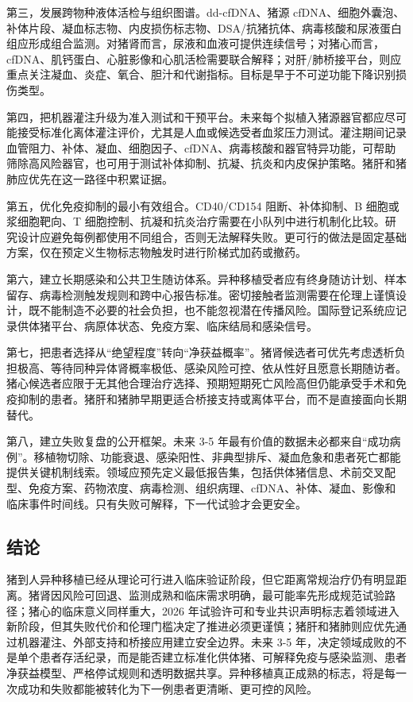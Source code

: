 \documentclass[
  chinese,
  11pt,a4paper]{article}
\begin{document}
第三，发展跨物种液体活检与组织图谱。dd-cfDNA、猪源
cfDNA、细胞外囊泡、补体片段、凝血标志物、内皮损伤标志物、DSA/抗猪抗体、病毒核酸和尿液蛋白组应形成组合监测。对猪肾而言，尿液和血液可提供连续信号；对猪心而言，cfDNA、肌钙蛋白、心脏影像和心肌活检需要联合解释；对肝/肺桥接平台，则应重点关注凝血、炎症、氧合、胆汁和代谢指标。目标是早于不可逆功能下降识别损伤类型。

第四，把机器灌注升级为准入测试和干预平台。未来每个拟植入猪源器官都应尽可能接受标准化离体灌注评价，尤其是人血或候选受者血浆压力测试。灌注期间记录血管阻力、补体、凝血、细胞因子、cfDNA、病毒核酸和器官特异功能，可帮助筛除高风险器官，也可用于测试补体抑制、抗凝、抗炎和内皮保护策略。猪肝和猪肺应优先在这一路径中积累证据。

第五，优化免疫抑制的最小有效组合。CD40/CD154 阻断、补体抑制、B
细胞或浆细胞靶向、T
细胞控制、抗凝和抗炎治疗需要在小队列中进行机制化比较。研究设计应避免每例都使用不同组合，否则无法解释失败。更可行的做法是固定基础方案，仅在预定义生物标志物触发时进行阶梯式加药或撤药。

第六，建立长期感染和公共卫生随访体系。异种移植受者应有终身随访计划、样本留存、病毒检测触发规则和跨中心报告标准。密切接触者监测需要在伦理上谨慎设计，既不能制造不必要的社会负担，也不能忽视潜在传播风险。国际登记系统应记录供体猪平台、病原体状态、免疫方案、临床结局和感染信号。

第七，把患者选择从``绝望程度''转向``净获益概率''。猪肾候选者可优先考虑透析负担极高、等待同种异体肾概率极低、感染风险可控、依从性好且愿意长期随访者。猪心候选者应限于无其他合理治疗选择、预期短期死亡风险高但仍能承受手术和免疫抑制的患者。猪肝和猪肺早期更适合桥接支持或离体平台，而不是直接面向长期替代。

第八，建立失败复盘的公开框架。未来 3-5
年最有价值的数据未必都来自``成功病例''。移植物切除、功能衰退、感染阳性、非典型排斥、凝血危象和患者死亡都能提供关键机制线索。领域应预先定义最低报告集，包括供体猪信息、术前交叉配型、免疫方案、药物浓度、病毒检测、组织病理、cfDNA、补体、凝血、影像和临床事件时间线。只有失败可解释，下一代试验才会更安全。

\subsection{结论}\label{ux7ed3ux8bba}

猪到人异种移植已经从理论可行进入临床验证阶段，但它距离常规治疗仍有明显距离。猪肾因风险可回退、监测成熟和临床需求明确，最可能率先形成规范试验路径；猪心的临床意义同样重大，2026
年试验许可和专业共识声明标志着领域进入新阶段，但其失败代价和伦理门槛决定了推进必须更谨慎；猪肝和猪肺则应优先通过机器灌注、外部支持和桥接应用建立安全边界。未来
3-5
年，决定领域成败的不是单个患者存活纪录，而是能否建立标准化供体猪、可解释免疫与感染监测、患者净获益模型、严格停试规则和透明数据共享。异种移植真正成熟的标志，将是每一次成功和失败都能被转化为下一例患者更清晰、更可控的风险。

\nocite{*}

\end{document}
